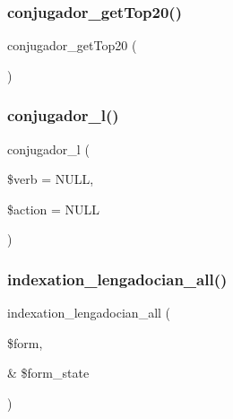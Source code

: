 \subsubsection{\texorpdfstring{conjugador\+\_\+get\+Top20()}{conjugador\_getTop20()}}
{\footnotesize\ttfamily conjugador\+\_\+get\+Top20 (\begin{DoxyParamCaption}{ }\end{DoxyParamCaption})}

\hypertarget{conjoc__web_form_8inc_aab99a7a60692cf7228d4a79924c32cb2}{}\label{conjoc__web_form_8inc_aab99a7a60692cf7228d4a79924c32cb2} 
\subsubsection{\texorpdfstring{conjugador\+\_\+l()}{conjugador\_l()}}
{\footnotesize\ttfamily conjugador\+\_\+l (\begin{DoxyParamCaption}\item[{}]{\$verb = {\ttfamily NULL},  }\item[{}]{\$action = {\ttfamily NULL} }\end{DoxyParamCaption})}

\hypertarget{conjoc__web_form_8inc_a465cce16b0d09f364ccb546c46c82306}{}\label{conjoc__web_form_8inc_a465cce16b0d09f364ccb546c46c82306} 
\subsubsection{\texorpdfstring{indexation\+\_\+lengadocian\+\_\+all()}{indexation\_lengadocian\_all()}}
{\footnotesize\ttfamily indexation\+\_\+lengadocian\+\_\+all (\begin{DoxyParamCaption}\item[{}]{\$form,  }\item[{\&}]{\$form\+\_\+state }\end{DoxyParamCaption})}

\hypertarget{conjoc__web_form_8inc_a9c7725a828c1a44761bc51fe7a346215}{}\label{conjoc__web_form_8inc_a9c7725a828c1a44761bc51fe7a346215} 
